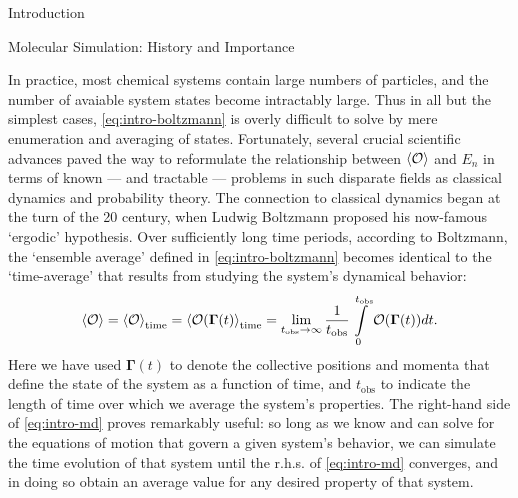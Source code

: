 \begin{chapter}{Introduction}
\begin{section}{Molecular Simulation: History and Importance}

In practice, most chemical systems contain large numbers of particles, and
the number of avaiable system states become intractably large. Thus in all but the
simplest cases, 
\cref{eq:intro-boltzmann} is overly difficult to solve by mere enumeration and
averaging of states.\cite{allen1989computer}
Fortunately,
several crucial scientific advances 
paved the way to reformulate the relationship between $\braket{\mathcal{O}}$ and $E_n$ in terms
of known --- and tractable --- problems in such disparate fields as classical dynamics
and probability theory.
The connection to classical dynamics began at the turn of the 20 century,
when Ludwig Boltzmann proposed his now-famous `ergodic' hypothesis.\cite{boltzmann1898vorlesungen} Over sufficiently
long time periods, according to Boltzmann, the `ensemble average' defined in \cref{eq:intro-boltzmann} becomes
identical to the `time-average' that results from studying the system's
dynamical behavior:
%
\newcommand{\tobs}{\ensuremath{t_{\text{obs}}}\xspace}
\begin{align}
\label{eq:intro-md}
\braket{\mathcal{O}} = \braket{\mathcal{O}}_{\text{time}} 
= \braket{\mathcal{O}(\bm{\Gamma}(t)}_{\text{time}} 
= \lim_{t_{\text{obs}} \to \infty} \frac{1}{t_{\text{obs}}}
\int\limits_0^{t_{\text{obs}}}
\mathcal{O}(\bm{\Gamma}(t)) dt .
\end{align}
%
Here we have used $\bm{\Gamma}(t)$ to denote the collective positions and
momenta that define the state of the system as a function of time, and \tobs
to indicate the length of time over which we average the system's
properties.\cite{allen1989computer} The
right-hand side of \cref{eq:intro-md} proves remarkably useful: so long as we know and can
solve for the equations of motion that govern a given system's behavior, we can
simulate the time evolution of that system until the r.h.s. of
\cref{eq:intro-md} converges, and in doing so obtain an average value for any desired
property of that system. 


\end{section}
\end{chapter}
